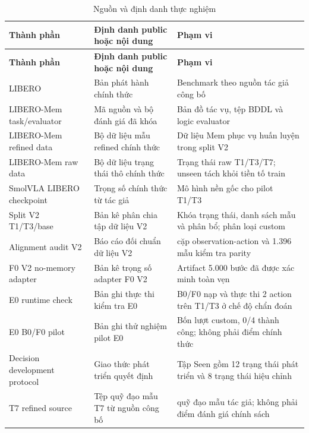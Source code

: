 \begingroup\footnotesize\setlength{\tabcolsep}{3pt}\renewcommand{\arraystretch}{1.05}
\begin{longtable}{>{\raggedright\arraybackslash}p{}|>{\raggedright\arraybackslash}p{}|>{\raggedright\arraybackslash}p{}}
\caption{Nguồn và định danh thực nghiệm}\label{tab:public-provenance}\\
\toprule
\textbf{Thành phần} & \textbf{Định danh public hoặc nội dung} & \textbf{Phạm vi} \\
\midrule\endfirsthead
\toprule
\textbf{Thành phần} & \textbf{Định danh public hoặc nội dung} & \textbf{Phạm vi} \\
\midrule\endhead
\bottomrule\endfoot
LIBERO & Bản phát hành chính thức \cite{liberoSource} & Benchmark theo nguồn tác giả công bố \\
LIBERO-Mem task/evaluator & Mã nguồn và bộ đánh giá đã khóa \cite{liberomemSource} & Bản đồ tác vụ, tệp BDDL và logic evaluator \\
LIBERO-Mem refined data & Bộ dữ liệu mẫu refined chính thức \cite{liberomemData} & Dữ liệu Mem phục vụ huấn luyện trong split V2 \\
LIBERO-Mem raw data & Bộ dữ liệu trạng thái thô chính thức \cite{liberomemRawData} & Trạng thái raw T1/T3/T7; unseen tách khỏi tiền tố train \\
SmolVLA LIBERO checkpoint & Trọng số chính thức từ tác giả \cite{smolvlaCheckpoint} & Mô hình nền gốc cho pilot T1/T3 \\
Split V2 T1/T3/base & Bản kê phân chia tập dữ liệu V2 & Khóa trạng thái, danh sách mẫu và phân bổ; phân loại custom \\
Alignment audit V2 & Báo cáo đối chuẩn dữ liệu V2 & 180.447 cặp observation-action và 1.396 mẫu kiểm tra parity \\
F0 V2 no-memory adapter & Bản kê trọng số adapter F0 V2 & Artifact 5.000 bước đã được xác minh toàn vẹn \\
E0 runtime check & Bản ghi thực thi kiểm tra E0 & B0/F0 nạp và thực thi 2 action trên T1/T3 ở chế độ chẩn đoán \\
E0 B0/F0 pilot & Bản ghi thử nghiệm pilot E0 & Bốn lượt custom, 0/4 thành công; không phải điểm chính thức \\
Decision development protocol & Giao thức phát triển quyết định & Tập Seen gồm 12 trạng thái phát triển và 8 trạng thái hiệu chỉnh \\
T7 refined source & Tệp quỹ đạo mẫu T7 từ nguồn công bố & 88 quỹ đạo mẫu tác giả; không phải điểm đánh giá chính sách \\

\end{longtable}
